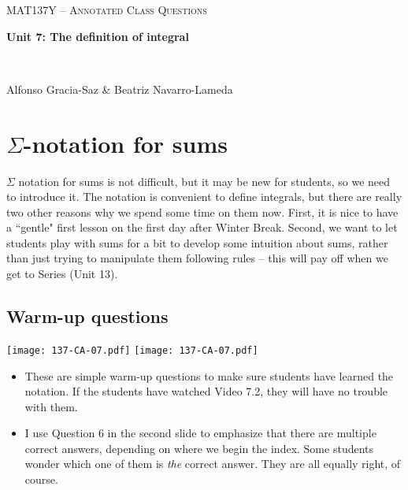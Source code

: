 \documentclass[11pt]{article}
\newcommand{\nl}{\hfill \vspace{-1.1\baselineskip}} %
\begin{document}
\thispagestyle{empty}
	\begin{center}
		{ {\LARGE  \scshape
		\textcolor{137cp3}{MAT137Y --   Annotated Class Questions}
		}
		
		\medskip
		{\bf \Large \textcolor{137cp1}{Unit 7: The definition of integral
		}}
		
		\
		
		\medskip
		{\large
		\textcolor{137cp1}{Alfonso Gracia-Saz \& Beatriz Navarro-Lameda}
		}}
	\end{center}

\vspace{5mm}

\tableofcontents

\newpage

\section{$\Sigma$-notation for sums}
\vspace{5mm}

$\Sigma$ notation for sums is not difficult, but it may be new for students, so we need to introduce it.    The notation is convenient to define integrals, but there are really two other reasons why we spend some time on them now.  First, it is nice to have a ``gentle" first lesson on the first day after Winter Break.  Second, we want to let students play with sums for a bit to develop some intuition about sums, rather than just trying to manipulate them following rules -- this will pay off when we get to Series (Unit 13).

\vspace{5mm}
\subsection{Warm-up questions}

\begin{center}
{ \texttt{[image: 137-CA-07.pdf]}} \quad
{ \texttt{[image: 137-CA-07.pdf]}} 
\end{center}

\begin{comments}
\nl
	\begin{itemize}
		\item  These are simple warm-up questions to make sure students have learned the notation.  If the students have watched Video 7.2, they will have no trouble with them.
		\item I use Question 6 in the second slide to emphasize that there are multiple correct answers, depending on where we begin the index.  Some students wonder which one of them is \emph{the} correct answer.  They are all equally right, of course.
	\end{itemize}
\end{comments}
\end{document}
